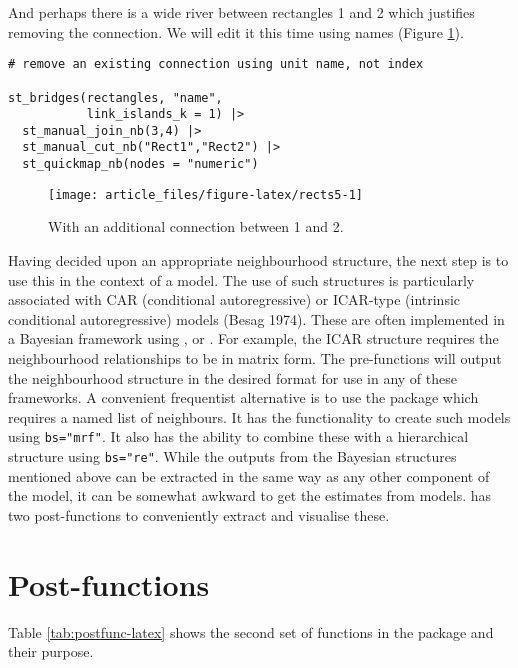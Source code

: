 And perhaps there is a wide river between rectangles 1 and 2 which
justifies removing the connection. We will edit it this time using
names (Figure \ref{fig:rects5}).

\begin{verbatim}
# remove an existing connection using unit name, not index

st_bridges(rectangles, "name", 
           link_islands_k = 1) |> 
  st_manual_join_nb(3,4) |> 
  st_manual_cut_nb("Rect1","Rect2") |> 
  st_quickmap_nb(nodes = "numeric")
\end{verbatim}

\begin{figure}

{\centering \texttt{[image: article\_files/figure-latex/rects5-1]} 

}

\caption{With an additional connection between 1 and 2. }\label{fig:rects5}
\end{figure}

Having decided upon an appropriate neighbourhood structure, the next step is to use this in the context of a model. The use of such structures is particularly associated with CAR (conditional autoregressive) or ICAR-type (intrinsic conditional autoregressive) models (Besag 1974).
These are often implemented in a Bayesian framework using
,  or . For example, the  ICAR structure requires the neighbourhood relationships to be in matrix form. The pre-functions will output the
neighbourhood structure in the desired format for use in any of these
frameworks. A convenient frequentist alternative is to use the
 package which requires a named list of neighbours. It has the functionality to create such models
using \texttt{bs="mrf"}. It also has the ability to combine these with a
hierarchical structure using \texttt{bs="re"}. While the outputs from the
Bayesian structures mentioned above can be extracted in the same way as
any other component of the model, it can be somewhat awkward to get the
estimates from  models.  has two post-functions to conveniently extract and visualise these.

\hypertarget{post-functions}{%
\section{Post-functions}\label{post-functions}}

Table \ref{tab:postfunc-latex} shows the second set of functions in the package and their purpose.

